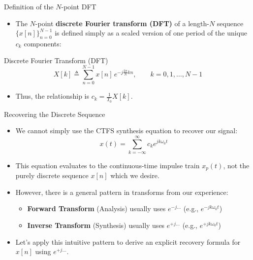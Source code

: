 \begin{frame}{Definition of the $N$-point DFT}
  \begin{itemize}
    \item The $N$-point \textbf{discrete Fourier transform (DFT)} of a length-$N$ sequence $\{x[n]\}_{n=0}^{N-1}$ is defined simply as a scaled version of one period of the unique $c_k$ components:
  \end{itemize}

  \vspace{0.2cm}
  \begin{conceptbox}{Discrete Fourier Transform (DFT)}
    \vspace{-0.2cm}
    \begin{equation*}
      X[k] \triangleq \sum_{n=0}^{N-1} x[n]\,e^{-j\frac{2\pi}{N}kn}, \qquad k=0,1,\dots,N-1
    \end{equation*}
  \end{conceptbox}

  \begin{itemize}
    \item Thus, the relationship is $c_k = \frac{1}{T_0}X[k]$.
  \end{itemize}
\end{frame}

\begin{frame}{Recovering the Discrete Sequence}
  \begin{itemize}
    \item<1-> We cannot simply use the CTFS synthesis equation to recover our signal:
      \begin{equation*}
        x(t) = \sum_{k=-\infty}^{\infty} c_k e^{jk\omega_0 t}
      \end{equation*}
    \item<1-> This equation evaluates to the continuous-time impulse train $x_p(t)$, not the purely discrete sequence $x[n]$ which we desire.
    \item<2-> However, there is a general pattern in transforms from our experience:
      \begin{itemize}
        \item \textbf{Forward Transform} (Analysis) usually uses $e^{-j\dots}$ (e.g., $e^{-jk\omega_0 t}$)
        \item \textbf{Inverse Transform} (Synthesis) usually uses $e^{+j\dots}$ (e.g., $e^{+jk\omega_0 t}$)
      \end{itemize}
    \item<2-> Let's apply this intuitive pattern to derive an explicit recovery formula for $x[n]$ using $e^{+j\dots}$.
  \end{itemize}
\end{frame}

